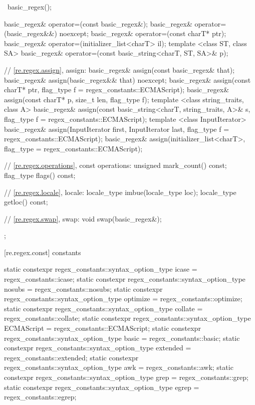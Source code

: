 \begin{codeblock}
{{    ~basic_regex();

    basic_regex& operator=(const basic_regex&);
    basic_regex& operator=(basic_regex&&) noexcept;
    basic_regex& operator=(const charT* ptr);
    basic_regex& operator=(initializer_list<charT> il);
    template <class ST, class SA>
      basic_regex& operator=(const basic_string<charT, ST, SA>& p);

    // \ref{re.regex.assign}, assign:
    basic_regex& assign(const basic_regex& that);
    basic_regex& assign(basic_regex&& that) noexcept;
    basic_regex& assign(const charT* ptr,
      flag_type f = regex_constants::ECMAScript);
    basic_regex& assign(const charT* p, size_t len, flag_type f);
    template <class string_traits, class A>
      basic_regex& assign(const basic_string<charT, string_traits, A>& s,
                          flag_type f = regex_constants::ECMAScript);
    template <class InputIterator>
      basic_regex& assign(InputIterator first, InputIterator last,
                          flag_type f = regex_constants::ECMAScript);
    basic_regex& assign(initializer_list<charT>,
                        flag_type = regex_constants::ECMAScript);

    // \ref{re.regex.operations}, const operations:
    unsigned mark_count() const;
    flag_type flags() const;

    // \ref{re.regex.locale}, locale:
    locale_type imbue(locale_type loc);
    locale_type getloc() const;

    // \ref{re.regex.swap}, swap:
    void swap(basic_regex&);
  }; 
}
\end{codeblock}

[re.regex.const]{ constants}
%

\begin{codeblock}
static constexpr regex_constants::syntax_option_type
  icase = regex_constants::icase;
static constexpr regex_constants::syntax_option_type
  nosubs = regex_constants::nosubs;
static constexpr regex_constants::syntax_option_type
  optimize = regex_constants::optimize;
static constexpr regex_constants::syntax_option_type
  collate = regex_constants::collate;
static constexpr regex_constants::syntax_option_type
  ECMAScript = regex_constants::ECMAScript;
static constexpr regex_constants::syntax_option_type
  basic = regex_constants::basic;
static constexpr regex_constants::syntax_option_type
  extended = regex_constants::extended;
static constexpr regex_constants::syntax_option_type
  awk = regex_constants::awk;
static constexpr regex_constants::syntax_option_type
  grep = regex_constants::grep;
static constexpr regex_constants::syntax_option_type
  egrep = regex_constants::egrep;
\end{codeblock}

